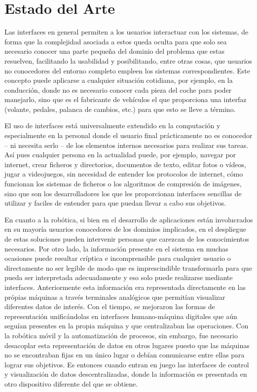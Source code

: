 \chapter{Estado del Arte} \label{chapter:estado_del_arte}
Las interfaces en general permiten a los usuarios interactuar con los sistemas, de forma que 
la complejidad asociada a estos queda oculta para que solo sea necesario 
conocer una parte pequeña del dominio del problema que estas resuelven, facilitando 
la usabilidad y posibilitando, entre otras cosas, que usuarios no conocedores del entorno completo empleen
los sistemas correspondientes. Este concepto puede aplicarse a cualquier situación cotidiana, por ejemplo,
en la conducción, donde no es necesario conocer cada pieza del coche para poder manejarlo, sino que 
es el fabricante de vehículos el que proporciona una interfaz (volante, pedales, palanca de cambios, etc.)
para que esto se lleve a término. 

El uso de interfaces está universalmente extendido en la computación y especialmente en la personal
donde el usuario final prácticamente no es conocedor -- ni necesita serlo -- de los elementos internos necesarios
para realizar sus tareas. Así pues cualquier persona en la actualidad puede, por ejemplo, navegar por internet, crear ficheros y 
directorios, documentos de texto, editar fotos o vídeos, jugar a videojuegos, sin necesidad de entender 
los protocolos de internet, cómo funcionan los sistemas de ficheros o los algoritmos de compresión de imágenes, sino que son 
los desarrolladores los que les proporcionan interfaces sencillas de utilizar y faciles de entender para que puedan llevar a cabo sus objetivos.

En cuanto a la robótica, si bien en el desarrollo de aplicaciones están involucrados en su mayoría usuarios conocedores
de los dominios implicados, en el despliegue de estas soluciones pueden intervenir personas que carezcan de los conocimientos
necesarios. Por otro lado, la información presente en el sistema en 
muchas ocasiones puede resultar críptica e incomprensible para cualquier usuario o directamente no ser legible 
de modo que es imprescindible transformarla para que pueda ser 
interpretada adecuadamente y eso solo puede realizarse mediante interfaces. 
Anteriormente esta información era representada directamente
en las própias máquinas a través terminales analógicos que permitían visualizar diferentes datos de interés. Con el tiempo, 
se mejoraron las formas de representación unificándolas en interfaces humano-máquina digitales que aún seguían presentes en la propia máquina 
y que centralizaban las operaciones. Con la robótica móvil y la automatización de procesos, sin embargo, fue necesario desacoplar esta representación 
de datos en otros
lugares puesto que las máquinas no se encontraban fijas en un único lugar o debían comunicarse entre ellas para lograr sus objetivos. Es entonces
cuando entran en juego las interfaces de control y visualización de datos descentralizadas, donde la información es presentada en otro dispositivo 
diferente del que se obtiene.

